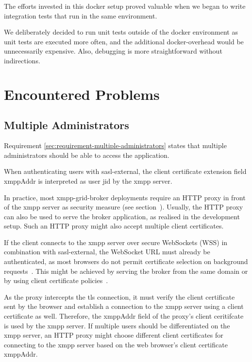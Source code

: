 The efforts invested in this docker setup proved valuable when we began to write integration tests that run in the same environment.

We deliberately decided to run unit tests outside of the docker environment as unit tests are executed more often, and the additional docker-overhead would be unnecessarily expensive.
Also, debugging is more straightforward without indirections.

\section{Encountered Problems}\label{encountered-problems}

\subsection{Multiple Administrators}\label{sec:limitations-of-requirement-multiple-administrators}

Requirement \ref{sec:requirement-multiple-administrators} states that multiple administrators should be able to access the application.

When authenticating users with \gls{sasl-external}, the client certificate extension field xmppAddr is interpreted as user \gls{jid} by the \gls{xmpp} server.

In practice, most \gls{xmpp-grid-broker} deployments require an HTTP proxy in front of the \gls{xmpp} server as security measure (see section~).
Usually, the HTTP proxy can also be used to serve the \gls{broker} application, as realised in the development setup.
Such an HTTP proxy might also accept multiple client certificates.

If the client connects to the \gls{xmpp} server over secure WebSockets (WSS) in combination with \gls{sasl-external}, the WebSocket URL must already be authenticated, as most browsers do not permit certificate selection on background requests~\cite{chromium-issue-background-certs}.
This might be achieved by serving the \gls{broker} from the same domain or by using client certificate policies~\cite{chrome-cert-policies}.

As the proxy intercepts the \gls{tls} connection, it must verify the client certificate sent by the browser and establish a connection to the \gls{xmpp} server using a client certificate as well.
Therefore, the xmppAddr field of the proxy's client ceritifcate is used by the \gls{xmpp} server.
If multiple users should be differentiated on the \gls{xmpp} server, an HTTP proxy might choose different client certificates for connecting to the \gls{xmpp} server based on the web browser's client certificate xmppAddr.


